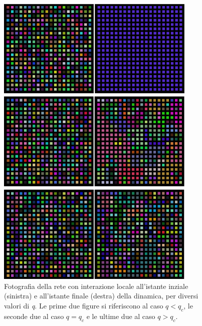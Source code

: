 \documentclass[a4paper,12pt]{article}
\begin{document}
\begin{figure}[!ht]
\begin{center}
\includegraphics[width=0.85\textwidth]{axelrod.eps}
\end{center}
\caption{Fotografia della rete con interazione locale all'istante inziale (sinistra) e all'istante finale (destra) della dinamica, per diversi valori di \textit{q}. Le prime due figure si riferiscono al caso $q<q_c$, le seconde due al caso $q = q_c$ e le ultime due al caso $q>q_c$.}
\label{axelrod}
\end{figure}

\clearpage
\end{document}
